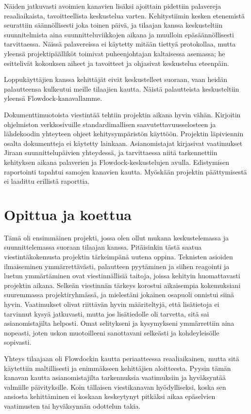 \documentclass{article}
\begin{document}
Näiden jatkuvasti avoimien kanavien lisäksi ajoittain pidettiin palavereja
reaaliaikaista, tavoitteellista keskustelua varten. Kehitystiimin kesken
etenemistä seurattiin säännöllisesti joka toinen päivä, ja tilaajan kanssa
keskusteltiin suunnitelmista aina suunnitteluviikkojen aikana ja muulloin
epäsäännöllisesti tarvittaessa. Näissä palavereissa ei käytetty mitään tiettyä
protokollaa, mutta yleensä projektipäälliköt toimivat puheenjohtajan
kaltaisessa asemassa; he esittelivät kokouksen aiheet ja tavoitteet ja
ohjasivat keskustelua eteenpäin.

Loppukäyttäjien kanssa kehittäjät eivät keskustelleet suoraan, vaan heidän
palautteensa kulkeutui meille tilaajien kautta. Näistä palautteista
keskusteltiin yleensä Flowdock-kanavallamme.

Dokumenttimuotoista viestintää tehtiin projektin aikana hyvin vähän. Kirjoitin
ohjelmiston verkkosivuille standardimallisen saavutettavuusselosteen ja
lähdekoodin yhteyteen ohjeet kehitys\-ympä\-ris\-tön käyttöön. Projektin läpiviennin
osalta dokumentteja ei käytetty lainkaan. Asianomistajat kirjasivat vaatimukset
Jiraan suunnittelupäivien yhteydessä, ja tarvittaessa niitä tarkennettiin
kehi\-tyk\-sen aikana palaverien ja Flow\-dock-keskustelujen avulla.
Edistymisen raportointi tapahtui samo\-jen kanavien kautta. Myöskään projektin
päättymisestä ei laadittu erillistä raporttia.

\section{Opittua ja koettua}

Tämä oli ensimmäinen projekti, jossa olen ollut mukana keskustelemassa ja
suunnittelemassa suoraan tilaajan kanssa. Pitäisinkin tästä saatua
viestintäkokemusta projektin tärkeimpänä uutena oppina. Teknisten asioiden
ilmaiseminen ymmärrettävästi, palautteen pyytäminen ja siihen reagointi ja
luetun ymmärtäminen ovat viestinnällisiä taitoja, joissa kehityin huomattavasti
projektin aikana. Selkeän viestinnän tärkeys korostui aikaisempia kokemuksiani
suuremmassa projektiryhmässä, ja mieles\-tä\-ni jokainen osapuoli onnistui
siinä hyvin. Vaatimukset olivat riittävän hyvin määriteltyjä, että lisätietoja
ei tarvinnut kysyä jatkuvasti, mutta jos lisätiedolle oli tarvetta, sitä sai
asianomistajilta helposti. Omat selitykseni ja kysymykseni ymmärrettiin aina
nopeasti, joten uskon muotoilleeni sanottavani selkeästi ja kohdeyleisölle
sopivasti.

Yhteys tilaajaan oli Flowdockin kautta periaatteessa reaaliaikainen, mutta sitä
käytettiin maltillisesti ja enimmäkseen kehittäjien aloitteesta. Pyysin tämän
kanavan kautta asianomistajilta tarkennuksia vaatimuksiin ja hyväksyntää
valmiille päivityksille. Koin tällaisen viestikanavan hyödylliseksi, koska sen
ansiosta kehittäminen ei koskaan keskeytynyt pitkäksi aikaa epäselvien
vaatimusten tai hyväksynnän odottelun takia.
\end{document}
